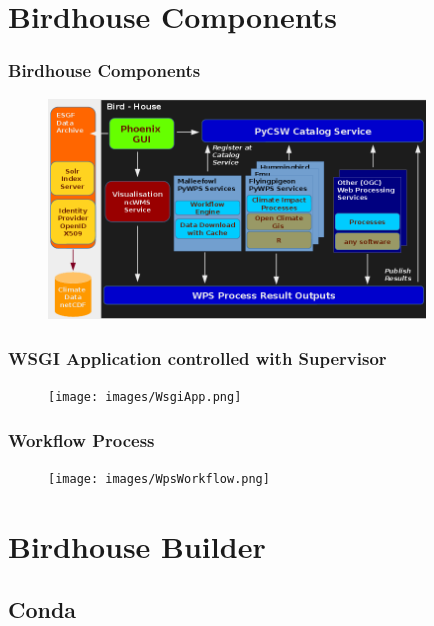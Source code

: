 \documentclass{beamer}
\begin{document}
  \section{Birdhouse Components}

  \begin{frame}[plain]
    \frametitle{Birdhouse Components}
    \begin{figure}
      \begin{center}
        \includegraphics[width=10cm]{images/birdhouse.png}
      \end{center}
    \end{figure}
  \end{frame}

  \begin{frame}[plain]
    \frametitle{WSGI Application controlled with Supervisor}
    \begin{figure}
      \texttt{[image: images/WsgiApp.png]}
    \end{figure}
  \end{frame}

  \begin{frame}[plain]
    \frametitle{Workflow Process}
    \begin{figure}
      \texttt{[image: images/WpsWorkflow.png]}
    \end{figure}
  \end{frame}

  \section{Birdhouse Builder}
  \subsection{Conda}
\end{document}
